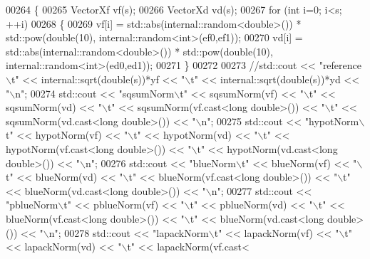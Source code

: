 \begin{DoxyCode}
00264 \{
00265   VectorXf vf(s);
00266   VectorXd vd(s);
00267   \textcolor{keywordflow}{for} (\textcolor{keywordtype}{int} i=0; i<s; ++i)
00268   \{
00269     vf[i] = std::abs(internal::random<double>()) * std::pow(\textcolor{keywordtype}{double}(10), internal::random<int>(ef0,ef1));
00270     vd[i] = std::abs(internal::random<double>()) * std::pow(\textcolor{keywordtype}{double}(10), internal::random<int>(ed0,ed1));
00271   \}
00272 
00273   \textcolor{comment}{//std::cout << "reference\(\backslash\)t" << internal::sqrt(double(s))*yf << "\(\backslash\)t" << internal::sqrt(double(s))*yd <<
       "\(\backslash\)n";}
00274   std::cout << \textcolor{stringliteral}{"sqsumNorm\(\backslash\)t"}  << sqsumNorm(vf)  << \textcolor{stringliteral}{"\(\backslash\)t"} << sqsumNorm(vd)  << \textcolor{stringliteral}{"\(\backslash\)t"} << sqsumNorm(vf.cast<\textcolor{keywordtype}{long}
       \textcolor{keywordtype}{double}>()) << \textcolor{stringliteral}{"\(\backslash\)t"} << sqsumNorm(vd.cast<\textcolor{keywordtype}{long} \textcolor{keywordtype}{double}>()) << \textcolor{stringliteral}{"\(\backslash\)n"};
00275   std::cout << \textcolor{stringliteral}{"hypotNorm\(\backslash\)t"}  << hypotNorm(vf)  << \textcolor{stringliteral}{"\(\backslash\)t"} << hypotNorm(vd)  << \textcolor{stringliteral}{"\(\backslash\)t"} << hypotNorm(vf.cast<\textcolor{keywordtype}{long}
       \textcolor{keywordtype}{double}>()) << \textcolor{stringliteral}{"\(\backslash\)t"} << hypotNorm(vd.cast<\textcolor{keywordtype}{long} \textcolor{keywordtype}{double}>()) << \textcolor{stringliteral}{"\(\backslash\)n"};
00276   std::cout << \textcolor{stringliteral}{"blueNorm\(\backslash\)t"}   << blueNorm(vf)   << \textcolor{stringliteral}{"\(\backslash\)t"} << blueNorm(vd)   << \textcolor{stringliteral}{"\(\backslash\)t"} << blueNorm(vf.cast<\textcolor{keywordtype}{long} \textcolor{keywordtype}{
      double}>()) << \textcolor{stringliteral}{"\(\backslash\)t"} << blueNorm(vd.cast<\textcolor{keywordtype}{long} \textcolor{keywordtype}{double}>()) << \textcolor{stringliteral}{"\(\backslash\)n"};
00277   std::cout << \textcolor{stringliteral}{"pblueNorm\(\backslash\)t"}  << pblueNorm(vf)  << \textcolor{stringliteral}{"\(\backslash\)t"} << pblueNorm(vd)  << \textcolor{stringliteral}{"\(\backslash\)t"} << blueNorm(vf.cast<\textcolor{keywordtype}{long} \textcolor{keywordtype}{
      double}>()) << \textcolor{stringliteral}{"\(\backslash\)t"} << blueNorm(vd.cast<\textcolor{keywordtype}{long} \textcolor{keywordtype}{double}>()) << \textcolor{stringliteral}{"\(\backslash\)n"};
00278   std::cout << \textcolor{stringliteral}{"lapackNorm\(\backslash\)t"} << lapackNorm(vf) << \textcolor{stringliteral}{"\(\backslash\)t"} << lapackNorm(vd) << \textcolor{stringliteral}{"\(\backslash\)t"} << lapackNorm(vf.cast<\textcolor{keywordtype}{
}
\end{DoxyCode}
